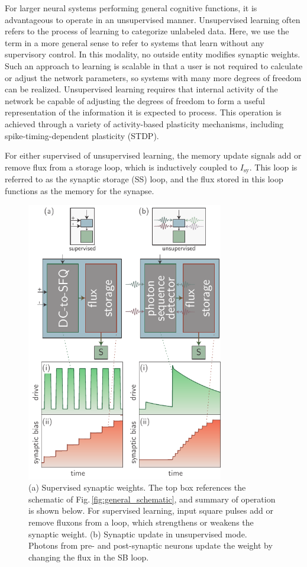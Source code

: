 \documentclass[twocolumn]{article}
\begin{document}
For larger neural systems performing general cognitive functions, it is advantageous to operate in an unsupervised manner. Unsupervised learning often refers to the process of learning to categorize unlabeled data. Here, we use the term in a more general sense to refer to systems that learn without any supervisory control. In this modality, no outside entity modifies synaptic weights. Such an approach to learning is scalable in that a user is not required to calculate or adjust the network parameters, so systems with many more degrees of freedom can be realized. Unsupervised learning requires that internal activity of the network be capable of adjusting the degrees of freedom to form a useful representation of the information it is expected to process. This operation is achieved through a variety of activity-based plasticity mechanisms, including spike-timing-dependent plasticity (STDP).

For either supervised of unsupervised learning, the memory update signals add or remove flux from a storage loop, which is inductively coupled to $I_{\mathrm{sy}}$. This loop is referred to as the synaptic storage (SS) loop, and the flux stored in this loop functions as the memory for the synapse.
\begin{figure}[t!]
	\centerline{\includegraphics[width=8.6cm]{_synapticPlasticity_schematic_small.pdf}}
	\caption{\label{fig:synapticPlasticity_schematic}(a) Supervised synaptic weights. The top box references the schematic of Fig.\,\ref{fig:general_schematic}, and summary of operation is shown below. For supervised learning, input square pulses add or remove fluxons from a loop, which strengthens or weakens the synaptic weight. (b) Synaptic update in unsupervised mode. Photons from pre- and post-synaptic neurons update the weight by changing the flux in the SB loop.}
\end{figure}
\end{document}
